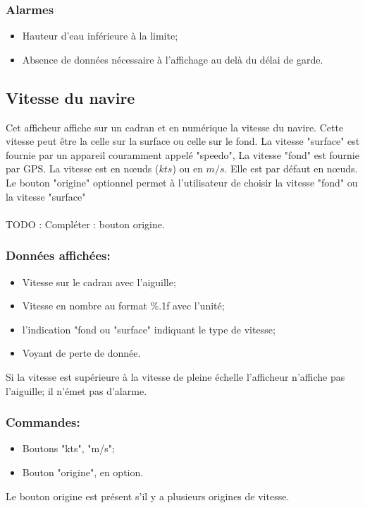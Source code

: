 \documentclass[a4paper,11pt]{report}
\begin{document}
\subsubsection{Alarmes}
\begin{itemize}
	\item Hauteur d'eau inférieure à la limite;
	\item Absence de données nécessaire à l'affichage
	au delà du délai de garde.
\end{itemize}

\subsection{Vitesse du navire}

Cet afficheur affiche sur un cadran et en numérique la vitesse du navire.
Cette vitesse peut être la celle sur la surface ou celle sur le fond.
La vitesse "surface" est fournie par un appareil couramment appelé "speedo",
La vitesse "fond" est fournie par GPS.
La vitesse est en nœuds ($kts$) ou en $m/s$.
Elle est par défaut en nœuds.
Le bouton "origine" optionnel permet à l'utilisateur de choisir
la vitesse "fond" ou la vitesse "surface"
\paragraph{}
TODO : Compléter : bouton origine.
\paragraph{}


\subsubsection{Données affichées:}
\begin{itemize}
	\item Vitesse sur le cadran avec l'aiguille;
	\item Vitesse en nombre au format \%.1f avec l'unité;
    \item l'indication "fond ou "surface" indiquant le type de vitesse;
    \item Voyant de perte de donnée.
\end{itemize}
Si la vitesse est supérieure à la vitesse de pleine échelle
l'afficheur n'affiche pas l'aiguille; il n'émet pas d'alarme.

\subsubsection{Commandes:}
\begin{itemize}
	\item Boutons "kts", "m/s";
    \item Bouton "origine", en option.
\end{itemize}
Le bouton origine est présent s'il y a plusieurs origines de vitesse.
\end{document}
